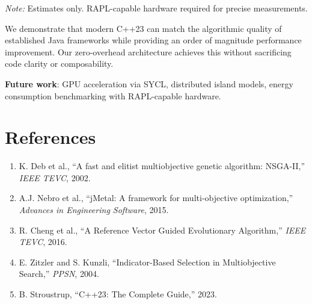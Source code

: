 \documentclass[10pt,a4paper]{article}
\begin{document}
\textit{Note:} Estimates only. RAPL-capable hardware required for precise measurements.

We demonstrate that modern C++23 can match the algorithmic quality of established Java frameworks while providing an order of magnitude performance improvement. Our zero-overhead architecture achieves this without sacrificing code clarity or composability.

\textbf{Future work}: GPU acceleration via SYCL, distributed island models, energy consumption benchmarking with RAPL-capable hardware.

\section*{References}

\begin{enumerate}
    \item K. Deb et al., ``A fast and elitist multiobjective genetic algorithm: NSGA-II,'' \textit{IEEE TEVC}, 2002.
    \item A.J. Nebro et al., ``jMetal: A framework for multi-objective optimization,'' \textit{Advances in Engineering Software}, 2015.
    \item R. Cheng et al., ``A Reference Vector Guided Evolutionary Algorithm,'' \textit{IEEE TEVC}, 2016.
    \item E. Zitzler and S. Kunzli, ``Indicator-Based Selection in Multiobjective Search,'' \textit{PPSN}, 2004.
    \item B. Stroustrup, ``C++23: The Complete Guide,'' 2023.
\end{enumerate}
\end{document}
